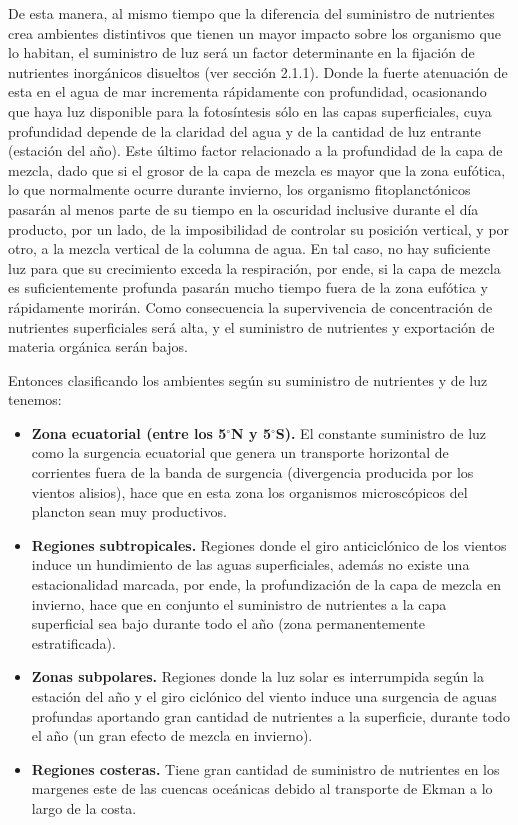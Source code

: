  De esta manera, al mismo tiempo que la diferencia del suministro de nutrientes crea ambientes distintivos que tienen un mayor impacto sobre los organismo que lo habitan, el suministro de luz ser\'a un factor determinante en la fijaci\'on de nutrientes inorg\'anicos disueltos (ver secci\'on 2.1.1). Donde la fuerte atenuaci\'on de esta en el agua de mar  incrementa r\'apidamente con profundidad, ocasionando que haya luz disponible para la fotos\'intesis s\'olo en las capas superficiales, cuya profundidad depende de la claridad del agua y de la cantidad de luz entrante (estaci\'on del a\~no). Este \'ultimo factor relacionado a la profundidad de la capa de mezcla, dado que si el grosor de la capa de mezcla es mayor que la zona euf\'otica, lo que normalmente ocurre durante invierno, los organismo fitoplanct\'onicos pasar\'an al menos parte de su tiempo en la oscuridad inclusive durante el d\'ia producto, por un lado, de la imposibilidad de controlar su posici\'on vertical, y por otro, a la mezcla vertical de la columna de agua. En tal caso, no hay suficiente luz para que su crecimiento exceda la respiraci\'on, por ende, si la capa de mezcla es suficientemente profunda pasar\'an mucho tiempo fuera de la zona euf\'otica y r\'apidamente morir\'an. Como consecuencia la supervivencia de concentraci\'on de nutrientes superficiales ser\'a alta, y el suministro de nutrientes y exportaci\'on de materia org\'anica ser\'an bajos.

Entonces clasificando los ambientes según su suministro de nutrientes y de luz tenemos: 

\begin{itemize}
 \item {\bf Zona ecuatorial (entre los 5$^\circ$N y 5$^\circ$S).} El constante suministro de luz como la surgencia ecuatorial que genera un transporte horizontal de corrientes fuera de la banda de surgencia (divergencia producida por los vientos alisios), hace que en esta zona los organismos microsc\'opicos del plancton sean muy productivos.

  \item {\bf Regiones subtropicales.} Regiones donde el giro anticiclónico de los vientos induce un hundimiento de las aguas superficiales, además no existe una estacionalidad marcada, por ende, la profundización de la capa de mezcla en invierno, hace que en conjunto el suministro de nutrientes a la capa superficial sea bajo durante todo el año (zona permanentemente estratificada). 
 
 \item {\bf Zonas subpolares.} Regiones donde la luz solar es interrumpida seg\'un la estaci\'on del a\~no y el giro ciclónico del viento induce una surgencia de aguas profundas aportando gran cantidad de nutrientes a la superficie, durante todo el año (un gran efecto de mezcla en invierno).

 \item{\bf Regiones costeras.} Tiene gran cantidad de suministro de nutrientes en los margenes este de las cuencas oceánicas debido al transporte de Ekman a lo largo de la costa.
\end{itemize}

